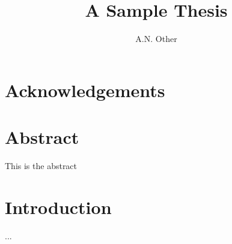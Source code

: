\documentclass[oneside]{scrbook}
\title{A Sample Thesis}
\author{A.N. Other}
\begin{document}
\maketitle
\frontmatter
\tableofcontents
\chapter{Acknowledgements}
\chapter{Abstract}
This is the abstract
\mainmatter
\chapter{Introduction}
...
\end{document}

